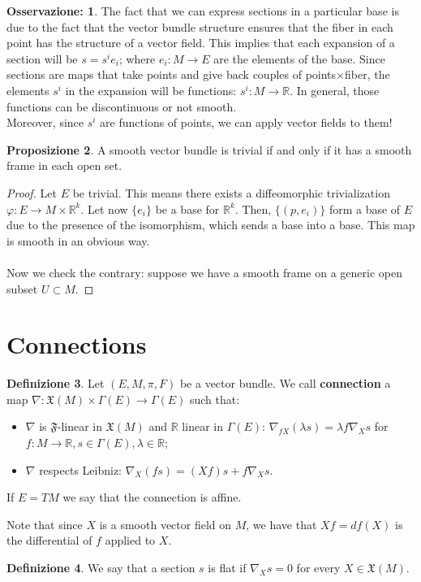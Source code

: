 \documentclass[12pt,a4paper]{report}
\theoremstyle{definition}
\newtheorem{Def}{Definizione}[chapter]
\theoremstyle{Theorem}
\newtheorem{Prop}[Def]{Proposizione}
\theoremstyle{definition}
\theoremstyle{definition}
\theoremstyle{definition}
\newtheorem{Obs}[Def]{Osservazione:}
\begin{document}
	\begin{Obs}
		The fact that we can express sections in a particular base is due to the fact that the vector bundle structure ensures that the fiber in each point has the structure of a vector field. This implies that each expansion of a section will be $s=s^ie_i$; where $e_i:M\rightarrow E$ are the elements of the base. Since sections are maps that take points and give back couples of points$\times$fiber, the elements $s^i$ in the expansion will be functions: $s^i:M\rightarrow \mathbb{R}$. In general, those functions can be discontinuous or not smooth.\\
		Moreover, since $s^i$ are functions of points, we can apply vector fields to them!
	\end{Obs}
	\begin{Prop}
		A smooth vector bundle is trivial if and only if it has a smooth frame in each open set.
	\end{Prop}
	\begin{proof}
		Let $E$ be trivial. This means there exists a diffeomorphic trivialization $\varphi:E\rightarrow M\times \mathbb{R}^k$. Let now $\{e_i\}$ be a base for $\mathbb{R}^k$. Then, $\{(p,e_i)\}$ form a base of $E$ due to the presence of the isomorphism, which sends a base into a base. This map is smooth in an obvious way.\\
		\\
		Now we check the contrary: suppose we have a smooth frame on a generic open subset $U\subset M$.
	\end{proof}
	\section{Connections}
	\begin{Def}
		Let $(E,M,\pi,F)$ be a vector bundle. We call \textbf{connection} a map $\nabla:\mathfrak{X}(M)\times\Gamma(E)\rightarrow\Gamma(E)$ such that:
		\begin{itemize}
			\item $\nabla$ is $\mathfrak{F}$-linear in $\mathfrak{X}(M)$ and $\mathbb{R}$ linear in $\Gamma(E)$: $\nabla_{fX}(\lambda s)=\lambda f\nabla_X s$ for $f:M\rightarrow \mathbb{R}, s\in\Gamma(E),\lambda\in\mathbb{R}$;
			\item $\nabla$ respects Leibniz: $\nabla_X (fs)=(Xf)s+f\nabla_X s$.
		\end{itemize}
		If $E=TM$ we say that the connection is affine.
	\end{Def}
	Note that since $X$ is a smooth vector field on $M$, we have that $Xf=df(X)$ is the differential of $f$ applied to $X$.
	\begin{Def}
		We say that a section $s$ is flat if $\nabla_X s=0$ for every $X\in \mathfrak{X}(M)$.
	\end{Def}
\end{document}
